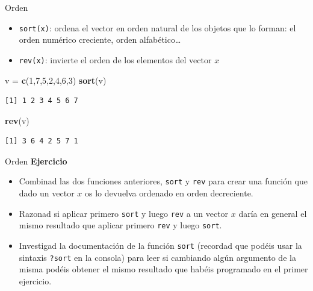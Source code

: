 \documentclass[
  ignorenonframetext,
  aspectratio=169]{beamer}
\newenvironment{Shaded}{\begin{snugshade}}{\end{snugshade}}
\newcommand{\DecValTok}[1]{\textcolor[rgb]{0.00,0.00,0.81}{#1}}
\newcommand{\FunctionTok}[1]{\textcolor[rgb]{0.13,0.29,0.53}{\textbf{#1}}}
\newcommand{\NormalTok}[1]{#1}
\newcommand{\OtherTok}[1]{\textcolor[rgb]{0.56,0.35,0.01}{#1}}
\providecommand{\tightlist}{%
  \setlength{\itemsep}{0pt}\setlength{\parskip}{0pt}}
\begin{document}
\begin{frame}[fragile]{Orden}
\label{orden}
\begin{itemize}
\tightlist
\item
  \texttt{sort(x)}: ordena el vector en orden natural de los objetos que
  lo forman: el orden numérico creciente, orden alfabético\ldots{}
\item
  \texttt{rev(x)}: invierte el orden de los elementos del vector \(x\)
\end{itemize}

\begin{Shaded}
\begin{Highlighting}[]
\NormalTok{v }\OtherTok{=} \FunctionTok{c}\NormalTok{(}\DecValTok{1}\NormalTok{,}\DecValTok{7}\NormalTok{,}\DecValTok{5}\NormalTok{,}\DecValTok{2}\NormalTok{,}\DecValTok{4}\NormalTok{,}\DecValTok{6}\NormalTok{,}\DecValTok{3}\NormalTok{)}
\FunctionTok{sort}\NormalTok{(v)}
\end{Highlighting}
\end{Shaded}

\begin{verbatim}
[1] 1 2 3 4 5 6 7
\end{verbatim}

\begin{Shaded}
\begin{Highlighting}[]
\FunctionTok{rev}\NormalTok{(v)}
\end{Highlighting}
\end{Shaded}

\begin{verbatim}
[1] 3 6 4 2 5 7 1
\end{verbatim}
\end{frame}

\begin{frame}[fragile]{Orden}
\label{orden-1}
\textbf{Ejercicio}

\begin{itemize}
\item
  Combinad las dos funciones anteriores, \texttt{sort} y \texttt{rev}
  para crear una función que dado un vector \(x\) os lo devuelva
  ordenado en orden decreciente.
\item
  Razonad si aplicar primero \texttt{sort} y luego \texttt{rev} a un
  vector \(x\) daría en general el mismo resultado que aplicar primero
  \texttt{rev} y luego \texttt{sort}.
\item
  Investigad la documentación de la función \texttt{sort} (recordad que
  podéis usar la sintaxis \texttt{?sort} en la consola) para leer si
  cambiando algún argumento de la misma podéis obtener el mismo
  resultado que habéis programado en el primer ejercicio.
\end{itemize}
\end{frame}
\end{document}
